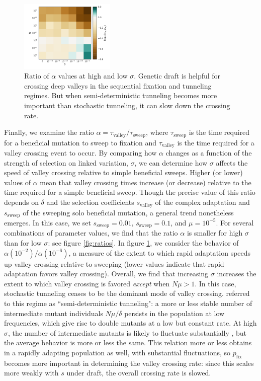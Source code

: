 \documentclass[rmp]{revtex4}
\newcommand{\pfix}{p_{\mathrm{fix}}}
\begin{document}
\begin{spacing}{1.5}
\begin{figure}
\includegraphics[width=0.4\textwidth]{Figures/compare_ratios.pdf}
\caption{Ratio of $\alpha$ values at high and low $\sigma$. Genetic draft is helpful for crossing deep valleys in the sequential fixation and tunneling regimes. But when semi-deterministic tunneling becomes more important than stochastic tunneling, it can slow down the crossing rate.}
\label{fig:alpha_ratio}
\end{figure}

Finally, we examine the ratio $\alpha = \tau_{\mathrm{valley}}/\tau_{\mathrm{sweep}}$, where $\tau_{\mathrm{sweep}}$ is the time required for a beneficial mutation to sweep to fixation and $\tau_{\mathrm{valley}}$ is the time required for a valley crossing event to occur.
By comparing how $\alpha$ changes as a function of the strength of selection on linked variation, $\sigma$, we can determine how $\sigma$ affects the speed of valley crossing relative to simple beneficial sweeps. Higher (or lower) values of $\alpha$ mean that valley crossing times increase (or decrease) relative to the time required for a simple beneficial sweep.
Though the precise value of this ratio depends on $\delta$ and the selection coefficients $s_{\mathrm{valley}}$ of the complex adaptation and $s_{\mathrm{sweep}}$ of the sweeping solo beneficial mutation, a general trend nonetheless emerges.
In this case, we set $s_{\mathrm{sweep}} = 0.01$, $s_{\mathrm{sweep}} = 0.1$, and $\mu = 10^{-5}$.
For several combinations of parameter values, we find that the ratio $\alpha$ is smaller for high $\sigma$ than for low $\sigma$: see figure \ref{fig:ratios}.
In figure \ref{fig:alpha_ratio}, we consider the behavior of $\alpha(10^{-2})/\alpha(10^{-6})$, a measure of the extent to which rapid adaptation speeds up valley crossing relative to sweeping (lower values indicate that rapid adaptation favors valley crossing).
Overall, we find that increasing $\sigma$ increases the extent to which valley crossing is favored \emph{except} when $N\mu > 1$.
In this case, stochastic tunneling ceases to be the dominant mode of valley crossing.
\citet{weissman_2009} referred to this regime as ``semi-deterministic tunneling": a more or less stable number of intermediate mutant individuals $N\mu/\delta$ persists in the population at low frequencies, which give rise to double mutants at a low but constant rate.
At high $\sigma$, the number of intermediate mutants is likely to fluctuate substantially \citep{cvijovic_2017}, but the average behavior is more or less the same.
This relation more or less obtains in a rapidly adapting population as well, with substantial fluctuations, so $\pfix$ becomes more important in determining the valley crossing rate: since this scales more weakly with $s$ under draft, the overall crossing rate is slowed.


\end{spacing}
\end{document}
